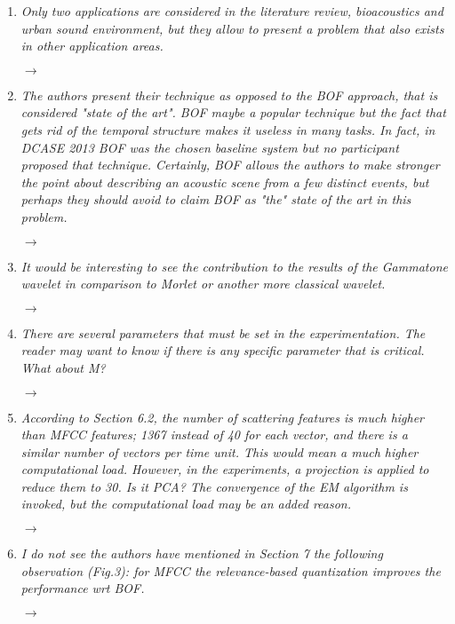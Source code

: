 \documentclass[10pt]{article}
\begin{document}
\begin{enumerate}

\item \emph{Only two applications are considered in the literature review, bioacoustics and urban sound environment, but they allow to present a problem that also exists in other application areas.}

$\rightarrow$

\item \emph{The authors present their technique as opposed to the BOF approach, that is considered "state of the art". BOF maybe a popular technique but the fact that gets rid of the temporal structure makes it useless in many tasks. In fact, in DCASE 2013 BOF was the chosen baseline system but no participant proposed that technique. Certainly, BOF allows the authors to make stronger the point about describing an acoustic scene from a few distinct events, but perhaps they should avoid to claim BOF as "the" state of the art in this problem.}

$\rightarrow$

\item \emph{It would be interesting to see the contribution to the results of the Gammatone wavelet in comparison to Morlet or another more classical wavelet.}

$\rightarrow$

\item \emph{There are several parameters that must be set in the experimentation. The reader may want to know if there is any specific parameter that is critical. What about M?}

$\rightarrow$

\item \emph{According to Section 6.2, the number of scattering features is much higher than MFCC features; 1367 instead of 40 for each vector, and there is a similar number of vectors per time unit. This would mean a much higher computational load. However, in the experiments, a projection is applied to reduce them to 30. Is it PCA? The convergence of the EM  algorithm is invoked, but the computational load may be an added reason.}

$\rightarrow$

\item \emph{I do not see the authors have mentioned in Section 7 the following observation (Fig.3): for MFCC the relevance-based quantization improves the performance wrt BOF.}

$\rightarrow$


\end{enumerate}
\end{document}
